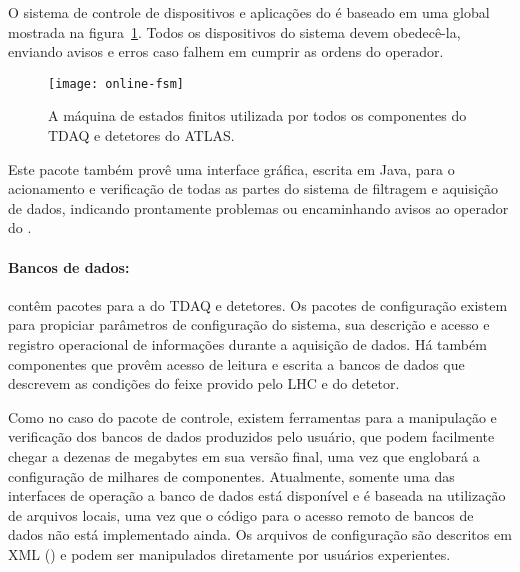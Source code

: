 O sistema de controle de dispositivos e aplicações do  é baseado
em uma  global mostrada na
figura~\ref{fig:online-fsm}. Todos os dispositivos do sistema devem
obedecê-la, enviando avisos e erros caso falhem em cumprir as ordens do
operador.

\begin{figure}
\begin{center}
\texttt{[image: online-fsm]}
\end{center}
\caption{A máquina de estados finitos utilizada por todos os componentes do
TDAQ e detetores do ATLAS.}
\label{fig:online-fsm}
\end{figure}

Este pacote também provê uma interface gráfica, escrita em Java, para o
acionamento e verificação de todas as partes do sistema de filtragem e
aquisição de dados, indicando prontamente problemas ou encaminhando avisos ao
operador do . 



\paragraph{Bancos de dados:} contêm pacotes para a  do TDAQ e
detetores. Os pacotes de configuração existem para propiciar parâmetros de
configuração do sistema, sua descrição e acesso e registro operacional de
informações durante a aquisição de dados. Há também componentes que provêm
acesso de leitura e escrita a bancos de dados que descrevem as condições do
feixe provido pelo LHC e do detetor.

Como no caso do pacote de controle, existem ferramentas para a manipulação e
verificação dos bancos de dados produzidos pelo usuário, que podem facilmente
chegar a dezenas de megabytes em sua versão final, uma vez que englobará a
configuração de milhares de componentes. Atualmente, somente uma das
interfaces de operação a banco de dados está disponível e é baseada na
utilização de arquivos locais, uma vez que o código para o acesso remoto de
bancos de dados não está implementado ainda. Os arquivos de configuração são
descritos em XML () e podem ser manipulados
diretamente por usuários experientes.


